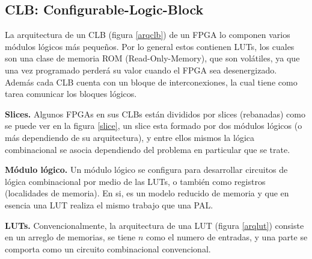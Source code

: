 \documentclass[twoside,spanish,ESP,MSc]{plantillaLabUPV}
\theoremstyle{definition}
\newcommand{\f}{FPGA }
\newcommand{\fs}{FPGAs }
\begin{document}
\subsection*{CLB: Configurable-Logic-Block}

La arquitectura de un CLB (figura \ref{arqclb}) de un \f lo componen varios módulos lógicos más pequeños. Por lo general estos contienen LUTs, los cuales son una clase de memoria ROM (Read-Only-Memory), que son volátiles, ya que una vez programado perderá su valor cuando el \f sea desenergizado. Además cada CLB cuenta con un bloque de interconexiones, la cual tiene como tarea comunicar los bloques lógicos.



\checkmark\textbf{Slices.} Algunos \fs en sus CLBs están divididos por slices (rebanadas) como se puede ver en la figura \ref{slice}, un slice esta formado por dos módulos lógicos (o más dependiendo de su arquitectura), y entre ellos mismos la lógica combinacional se asocia dependiendo del problema en particular que se trate.



\checkmark\textbf{Módulo lógico.} Un módulo lógico se configura para desarrollar circuitos de lógica combinacional por medio de las LUTs, o también como registros (localidades de memoria). En si, es un modelo reducido de memoria  y que en esencia una LUT realiza el mismo trabajo que una PAL.


\checkmark\textbf{LUTs.} Convencionalmente, la arquitectura de una LUT (figura \ref{arqlut}) consiste en un arreglo de memorias, se tiene $n$ como el numero de entradas, y una parte se comporta como un circuito combinacional convencional.

\end{document}
